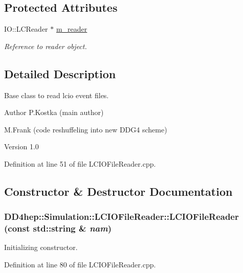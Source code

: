 \subsection*{Protected Attributes}
\begin{DoxyCompactItemize}
\item 
IO::LCReader $\ast$ \hyperlink{class_d_d4hep_1_1_simulation_1_1_l_c_i_o_file_reader_a11b157abd2a7ac565d63d82158974ad7}{m\_\-reader}
\begin{DoxyCompactList}\small\item\em Reference to reader object. \item\end{DoxyCompactList}\end{DoxyCompactItemize}


\subsection{Detailed Description}
Base class to read lcio event files. \begin{DoxyAuthor}{Author}
P.Kostka (main author) 

M.Frank (code reshuffeling into new DDG4 scheme) 
\end{DoxyAuthor}
\begin{DoxyVersion}{Version}
1.0 
\end{DoxyVersion}


Definition at line 51 of file LCIOFileReader.cpp.

\subsection{Constructor \& Destructor Documentation}
\hypertarget{class_d_d4hep_1_1_simulation_1_1_l_c_i_o_file_reader_a98e9bb0a70768e6cd517f7f3ab552dc6}{
\subsubsection[{LCIOFileReader}]{\setlength{\rightskip}{0pt plus 5cm}DD4hep::Simulation::LCIOFileReader::LCIOFileReader (const std::string \& {\em nam})}}
\label{class_d_d4hep_1_1_simulation_1_1_l_c_i_o_file_reader_a98e9bb0a70768e6cd517f7f3ab552dc6}


Initializing constructor. 

Definition at line 80 of file LCIOFileReader.cpp.

